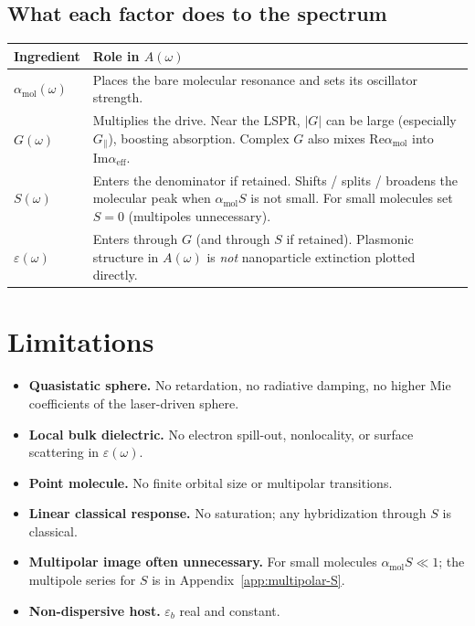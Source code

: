 \documentclass[11pt,a4paper]{article}
\theoremstyle{definition}
\newcommand{\epsb}{\varepsilon_b}
\newcommand{\epsm}{\varepsilon}
\newcommand{\alpham}{\alpha_{\text{mol}}}
\newcommand{\alphaeff}{\alpha_{\mathrm{eff}}}
\begin{document}
\subsection{What each factor does to the spectrum}

\begin{center}
\begin{tabular}{@{}p{}p{}@{}}
\toprule
Ingredient & Role in $A(\omega)$ \\
\midrule
$\alpham(\omega)$ & Places the bare molecular resonance and sets its oscillator strength. \\[0.4em]
$G(\omega)$ & Multiplies the drive. Near the LSPR, $|G|$ can be large (especially $G_\parallel$), boosting absorption. Complex $G$ also mixes $\mathrm{Re} \alpham$ into $\mathrm{Im} \alphaeff$. \\[0.4em]
$S(\omega)$ & Enters the denominator if retained. Shifts / splits / broadens the molecular peak when $\alpham S$ is not small. For small molecules set $S=0$ (multipoles unnecessary). \\[0.4em]
$\epsm(\omega)$ & Enters through $G$ (and through $S$ if retained). Plasmonic structure in $A(\omega)$ is \emph{not} nanoparticle extinction plotted directly. \\
\bottomrule
\end{tabular}
\end{center}

\section{Limitations}

\begin{itemize}[leftmargin=1.6em]
  \item \textbf{Quasistatic sphere.} No retardation, no radiative damping, no higher Mie coefficients of the laser-driven sphere.
  \item \textbf{Local bulk dielectric.} No electron spill-out, nonlocality, or surface scattering in $\epsm(\omega)$.
  \item \textbf{Point molecule.} No finite orbital size or multipolar transitions.
  \item \textbf{Linear classical response.} No saturation; any hybridization through $S$ is classical.
  \item \textbf{Multipolar image often unnecessary.} For small molecules $\alpham S\ll 1$; the multipole series for $S$ is in Appendix~\ref{app:multipolar-S}.
  \item \textbf{Non-dispersive host.} $\epsb$ real and constant.
\end{itemize}
\end{document}
